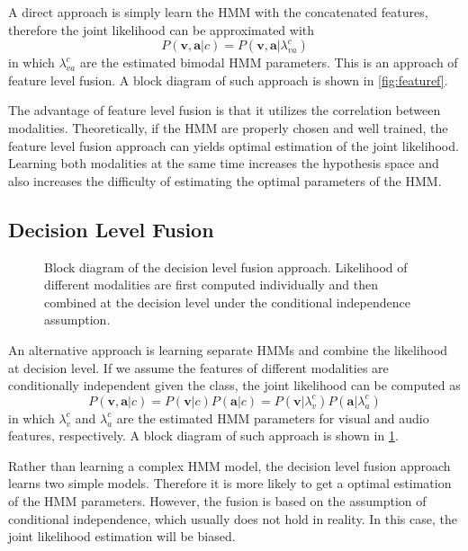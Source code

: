 \documentclass[12pt,final,twoside]{report}
\theoremstyle{plain}
\theoremstyle{definition}
\theoremstyle{remark}
\newcommand{\includetexfig}[1]{}
\begin{document}
A direct approach is simply learn the HMM with the concatenated features, therefore the joint likelihood can be approximated with 
\begin{equation}
  P(\mathbf{v},\mathbf{a}|c) = P(\mathbf{v},\mathbf{a}|\lambda_{va}^c)
\end{equation}
in which $\lambda_{va}^c$ are the estimated bimodal HMM parameters. This is an approach of feature level fusion. A block diagram of such approach is shown in \cref{fig:featuref}.

The advantage of feature level fusion is that it utilizes the correlation between modalities. Theoretically, if the HMM are properly chosen and well trained, the feature level fusion approach can yields optimal estimation of the joint likelihood. Learning both modalities at the same time increases the hypothesis space and also increases the difficulty of estimating the optimal parameters of the HMM.

\subsection{Decision Level Fusion}
\begin{figure}[t]
  \centering
  \includetexfig{decisionf}
  \caption[Block diagram of the decision level fusion approach.]{Block diagram of the decision level fusion approach. Likelihood of different modalities are first computed individually and then combined at the decision level under the conditional independence assumption.}
  \label{fig:decisionf}
\end{figure}

An alternative approach is learning separate HMMs and combine the likelihood at decision level. If we assume the features of different modalities are conditionally independent given the class, the joint likelihood can be computed as
\begin{equation}
  P(\mathbf{v},\mathbf{a}|c) = P(\mathbf{v}|c) P(\mathbf{a}|c) = P(\mathbf{v}|\lambda_v^c) P(\mathbf{a}|\lambda_a^c)
\end{equation}
in which $\lambda_{v}^c$ and $\lambda_{a}^c$ are the estimated HMM parameters for visual and audio features, respectively. A block diagram of such approach is shown in \cref{fig:decisionf}.

Rather than learning a complex HMM model, the decision level fusion approach learns two simple models. Therefore it is more likely to get a optimal estimation of the HMM parameters. However, the fusion is based on the assumption of conditional independence, which usually does not hold in reality. In this case, the joint likelihood estimation will be biased.
\end{document}
